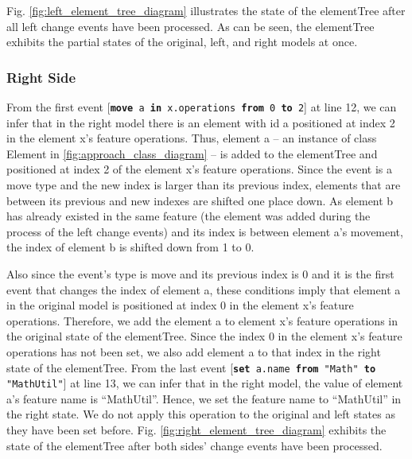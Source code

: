 Fig. \ref{fig:left_element_tree_diagram} illustrates the state of the \textsf{elementTree} after all left change events have been processed. As can be seen, the \textsf{elementTree} exhibits the partial states of the original, left, and right models at once. 

\subsubsection{Right Side}\label{sec:right_side}  From the first event [\texttt{\small \textbf{move} a \textbf{in} x.operations \textbf{from} 0 \textbf{to} 2}] at line 12, we can infer that in the right model there is an element with id \textsf{a} positioned at index 2 in the element \textsf{x}'s feature \textsf{operations}. Thus, element \textsf{a} -- an instance of class \textsf{Element} in \ref{fig:approach_class_diagram} -- is added to the \textsf{elementTree} and positioned at index 2 of the element \textsf{x}'s feature \textsf{operations}. Since the event is a \textsf{move} type and the new index is larger than its previous index, elements that are between its previous and new indexes are shifted one place down. As element \textsf{b} has already existed in the same feature (the element was added during the process of the left change events) and its index is between element \textsf{a}'s movement, the index of element \textsf{b} is shifted down from 1 to 0. 

Also since the event's type is \textsf{move} and its previous index is 0 and it is the first event that changes the index of element \textsf{a}, these conditions imply that element \textsf{a} in the original model is positioned at index 0 in the element \textsf{x}'s feature \textsf{operations}. Therefore, we add the element \textsf{a} to element \textsf{x}'s feature \textsf{operations} in the original state of the \textsf{elementTree}. Since the index 0 in the element \textsf{x}'s feature \textsf{operations} has not been set, we also add element \textsf{a} to that index in the right state of the \textsf{elementTree}. From the last event [\texttt{\small \textbf{set} a.name \textbf{from} "Math" \textbf{to} "MathUtil"}] at line 13, we can infer that in the right model, the value of element \textsf{a}'s feature \textsf{name} is ``MathUtil''. Hence, we set the feature \textsf{name} to ``MathUtil'' in the right state. 
We do not apply this operation to the original and left states as they have been set before.
Fig. \ref{fig:right_element_tree_diagram} exhibits the state of the \textsf{elementTree} after both sides' change events have been processed.

